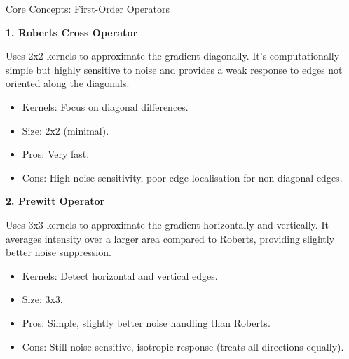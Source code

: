 \documentclass[final]{beamer}
\newlength{\colwidth}
\begin{document}
\begin{frame}[t]
\begin{columns}[t]
\begin{column}{\colwidth}
  \begin{block}{Core Concepts: First-Order Operators}

    \textbf{1. Roberts Cross Operator} \par
    Uses 2x2 kernels to approximate the gradient diagonally. It's computationally simple but highly sensitive to noise and provides a weak response to edges not oriented along the diagonals.
    \begin{itemize}
        \item Kernels: Focus on diagonal differences.
        \item Size: 2x2 (minimal).
        \item Pros: Very fast.
        \item Cons: High noise sensitivity, poor edge localisation for non-diagonal edges.
    \end{itemize}

    \textbf{2. Prewitt Operator} \par
    Uses 3x3 kernels to approximate the gradient horizontally and vertically. It averages intensity over a larger area compared to Roberts, providing slightly better noise suppression.
     \begin{itemize}
        \item Kernels: Detect horizontal and vertical edges.
        \item Size: 3x3.
        \item Pros: Simple, slightly better noise handling than Roberts.
        \item Cons: Still noise-sensitive, isotropic response (treats all directions equally).
    \end{itemize}


\end{block}
\end{column}
\end{columns}
\end{frame}
\end{document}
